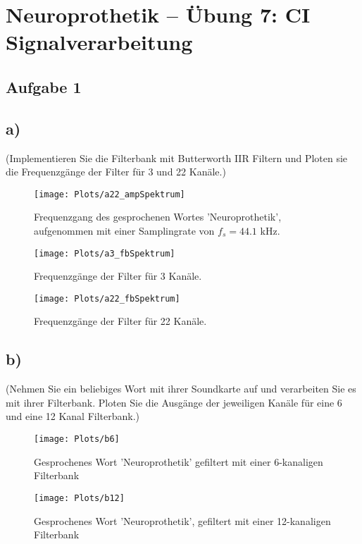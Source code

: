 \documentclass[
a4paper, 
12pt, 
]{article}
\begin{document}
	
	\thispagestyle{firstpage} 			%
	
	\section*{Neuroprothetik -- Übung 7: CI Signalverarbeitung}
	\subsection{Aufgabe 1}
	\subsection*{a)} (Implementieren Sie die Filterbank mit Butterworth IIR Filtern und Ploten sie die Frequenzgänge der Filter für 3 und 22 Kanäle.)\\
	\begin{figure}[h]
\centering
\texttt{[image: Plots/a22\_ampSpektrum]}
\caption{Frequenzgang des gesprochenen Wortes 'Neuroprothetik', aufgenommen mit einer Samplingrate von $f_s = 44.1$ kHz.}
\label{fig:a22_ampSpektrum}
\end{figure}

	\begin{figure}[h]
		\centering
		\texttt{[image: Plots/a3\_fbSpektrum]}
		\caption{Frequenzgänge der Filter für 3 Kanäle.}
		\label{fig:a3_fbSpektrum}
	\end{figure}

	
	\begin{figure}
\centering
\texttt{[image: Plots/a22\_fbSpektrum]}
\caption{Frequenzgänge der Filter für 22 Kanäle.}
\label{fig:a22_fbSpektrum}
\end{figure}

\subsection*{b)} (Nehmen Sie ein beliebiges Wort mit ihrer Soundkarte auf und verarbeiten Sie es mit
ihrer Filterbank. Ploten Sie die Ausgänge der jeweiligen Kanäle für eine 6 und eine 12
Kanal Filterbank.)
\begin{figure}[h]
\centering
\texttt{[image: Plots/b6]}
\caption{Gesprochenes Wort 'Neuroprothetik' gefiltert mit einer 6-kanaligen Filterbank}
\label{fig:b6}
\end{figure}


\begin{figure}[h]
\centering
\texttt{[image: Plots/b12]}
\caption{Gesprochenes Wort 'Neuroprothetik', gefiltert mit einer 12-kanaligen Filterbank}
\label{fig:b12}
\end{figure}
\end{document}

